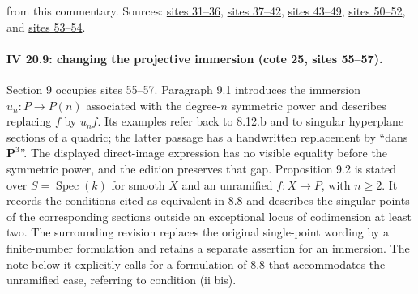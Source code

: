 \documentclass[10pt,a4paper]{article}
\begin{document}
from this commentary. Sources: \href{https://grothendieck.umontpellier.fr/web/viewer.html?file=../25.pdf\#page=32}{sites 31--36}, \href{https://grothendieck.umontpellier.fr/web/viewer.html?file=../25.pdf\#page=38}{sites 37--42}, \href{https://grothendieck.umontpellier.fr/web/viewer.html?file=../25.pdf\#page=44}{sites 43--49}, \href{https://grothendieck.umontpellier.fr/web/viewer.html?file=../25.pdf\#page=51}{sites 50--52}, and \href{https://grothendieck.umontpellier.fr/web/viewer.html?file=../25.pdf\#page=54}{sites 53--54}.
\par{}

\par{}
\paragraph{IV 20.9: changing the projective immersion (cote 25, sites 55--57).}
Section 9 occupies sites 55--57. Paragraph 9.1 introduces the immersion $u_n:P\to P(n)$ associated with the degree-$n$ symmetric power and describes replacing $f$ by $u_nf$. Its examples refer back to 8.12.b and to singular hyperplane sections of a quadric; the latter passage has a handwritten replacement by ``dans $\mathbf P^3$''. The displayed direct-image expression has no visible equality before the symmetric power, and the edition preserves that gap. Proposition 9.2 is stated over $S=\operatorname{Spec}(k)$ for smooth $X$ and an unramified $f:X\to P$, with $n\geq2$. It records the conditions cited as equivalent in 8.8 and describes the singular points of the corresponding sections outside an exceptional locus of codimension at least two. The surrounding revision replaces the original single-point wording by a finite-number formulation and retains a separate assertion for an immersion. The note below it explicitly calls for a formulation of 8.8 that accommodates the unramified case, referring to condition (ii bis).
\end{document}
